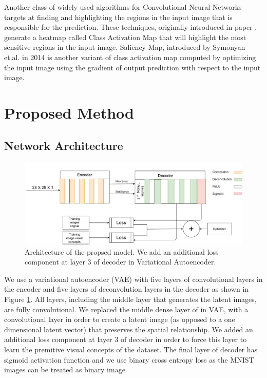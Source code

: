 \documentclass{}
\begin{document}
Another class of widely used algorithms for  Convolutional Neural Networks  targets at finding and highlighting the  regions in the input image that is responsible for the prediction.
These techniques, originally introduced in paper \cite{zhou2016learning}, generate a heatmap called Class Activation Map that will highlight the most sensitive regions in the input image.
Saliency Map, introduced by Symonyan et.al. in 2014 \cite{simonyan2014deep} is another variant of class activation map computed by optimizing the input image using the gradient of output prediction with respect to the input image.

\section{Proposed Method}
\subsection{Network Architecture}

\begin{figure}[!t]
\centering
\includegraphics[width=0.9\linewidth]{images/cnn_arch}
\vspace{0.2in}

\caption{Architecture of the propsed model. We add an additional loss component at layer 3 of decoder in Variational Autoencoder.}
\label{cnn_arch}
\end{figure}

We use a variational autoencoder (VAE) with five layers of convolutional layers in the encoder and five layers of deconvolution layers in the decoder as shown in Figure \ref{cnn_arch}.
All layers, including the middle layer that generates the latent images, are fully convolutional.
We replaced the middle dense layer of in VAE, with a convolutional layer in order to create a latent image (as opposed to a one dimensional latent vector) that preserves the spatial relationship.
We added an additional loss component at layer 3 of decoder in order to force this layer to learn the premitive visual concepts of the dataset.
The final layer of decoder has sigmoid activation function and we use binary cross entropy loss as the MNIST images can be treated as binary image.
\end{document}
